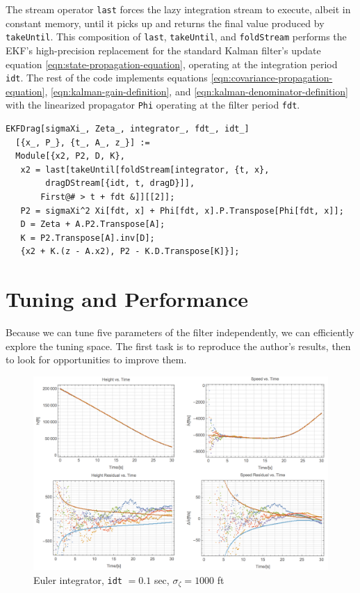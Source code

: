 \documentclass[10pt,oneside,x11names]{article}
\begin{document}
The stream operator \texttt{last} forces the lazy integration stream to execute, albeit
in constant memory, until it picks up and returns the final value produced by
\texttt{takeUntil}. This composition of \texttt{last}, \texttt{takeUntil}, and \texttt{foldStream} performs
the EKF's high-precision replacement for the standard Kalman filter's update
equation \ref{eqn:state-propagation-equation}, operating at the integration
period \texttt{idt}. The rest of the code implements equations
\ref{eqn:covariance-propagation-equation}, \ref{eqn:kalman-gain-definition}, and
\ref{eqn:kalman-denominator-definition} with the linearized propagator \texttt{Phi}
operating at the filter period \texttt{fdt}.

\begin{verbatim}
EKFDrag[sigmaXi_, Zeta_, integrator_, fdt_, idt_]
  [{x_, P_}, {t_, A_, z_}] :=
  Module[{x2, P2, D, K},
   x2 = last[takeUntil[foldStream[integrator, {t, x},
        dragDStream[{idt, t, dragD}]],
       First@# > t + fdt &]][[2]];
   P2 = sigmaXi^2 Xi[fdt, x] + Phi[fdt, x].P.Transpose[Phi[fdt, x]];
   D = Zeta + A.P2.Transpose[A];
   K = P2.Transpose[A].inv[D];
   {x2 + K.(z - A.x2), P2 - K.D.Transpose[K]}];
\end{verbatim}

\section{Tuning and Performance}
\label{sec:orgheadline11}

Because we can tune five parameters of the filter independently, we can efficiently
explore the tuning space. The first task is to reproduce the author's results,
then to look for opportunities to improve them.

\begin{figure}[htb]
\centering
\includegraphics[width=.9\linewidth]{euler-idt-point-1-zeta-1000.png}
\caption{\label{fig:orgparagraph2}
Euler integrator, \texttt{idt} \(= 0.1\) sec, \(\sigma_\zeta = 1000\) ft}
\end{figure}
\end{document}
